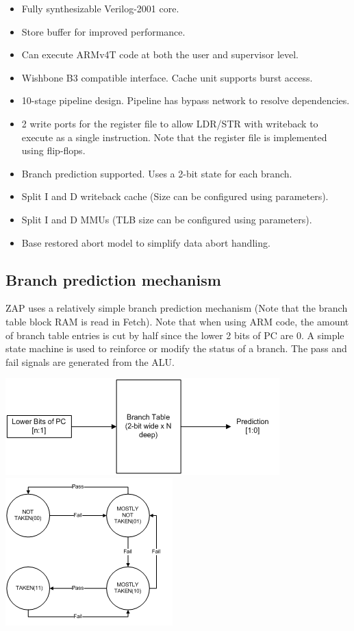 \documentclass[10pt]{article}
\begin{document}
\begin{itemize}
\item Fully synthesizable Verilog-2001 core.   
\item          Store buffer for improved performance.   
\item          Can execute ARMv4T code at both the user and supervisor level. 
\item          Wishbone B3 compatible interface. Cache unit supports burst access.
\item          10-stage pipeline design. Pipeline has bypass network to resolve 
               dependencies.
\item          2 write ports for the register file to allow LDR/STR with 
               writeback to execute as a single instruction. Note that the 
               register file is implemented using flip-flops.
\item          Branch prediction supported. Uses a 2-bit state for each branch.
\item          Split I and D writeback cache (Size can be configured using parameters).
\item          Split I and D MMUs (TLB size can be configured using parameters).
\item          Base restored abort model to simplify data abort handling.
\end{itemize}

\subsection{Branch prediction mechanism}

ZAP uses a relatively simple branch prediction mechanism (Note that the branch 
table block RAM is read in Fetch). Note that when using ARM code, the amount of 
branch table entries is cut by half since the lower 2 bits of PC are 0. A 
simple state machine is used to reinforce or modify the status of a branch. The 
pass and fail signals are generated from the ALU.

\includegraphics{images/image008.png}
\\
\includegraphics{images/image010.png}
\end{document}
